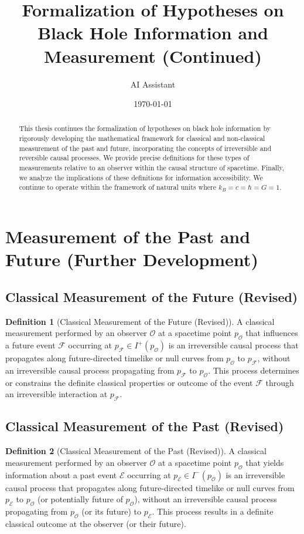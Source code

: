 \documentclass{article}
\title{Formalization of Hypotheses on Black Hole Information and Measurement (Continued)}
\author{AI Assistant}
\date{\today}
\theoremstyle{definition}
\newtheorem{definition}{Definition}[section]
\begin{document}
	
	\maketitle
	
	\begin{abstract}
		This thesis continues the formalization of hypotheses on black hole information by rigorously developing the mathematical framework for classical and non-classical measurement of the past and future, incorporating the concepts of irreversible and reversible causal processes. We provide precise definitions for these types of measurements relative to an observer within the causal structure of spacetime. Finally, we analyze the implications of these definitions for information accessibility. We continue to operate within the framework of natural units where $k_B = c = \hbar = G = 1$.
	\end{abstract}
	
	\section{Measurement of the Past and Future (Further Development)}
	
	\subsection{Classical Measurement of the Future (Revised)}
	
	\begin{definition}[Classical Measurement of the Future (Revised)]
		A classical measurement performed by an observer $\mathcal{O}$ at a spacetime point $p_{\mathcal{O}}$ that influences a future event $\mathcal{F}$ occurring at $p_{\mathcal{F}} \in I^+(p_{\mathcal{O}})$ is an irreversible causal process that propagates along future-directed timelike or null curves from $p_{\mathcal{O}}$ to $p_{\mathcal{F}}$, without an irreversible causal process propagating from $p_{\mathcal{F}}$ to $p_{\mathcal{O}}$. This process determines or constrains the definite classical properties or outcome of the event $\mathcal{F}$ through an irreversible interaction at $p_{\mathcal{F}}$.
	\end{definition}
	
	\subsection{Classical Measurement of the Past (Revised)}
	
	\begin{definition}[Classical Measurement of the Past (Revised)]
		A classical measurement performed by an observer $\mathcal{O}$ at a spacetime point $p_{\mathcal{O}}$ that yields information about a past event $\mathcal{E}$ occurring at $p_{\mathcal{E}} \in I^-(p_{\mathcal{O}})$ is an irreversible causal process that propagates along future-directed timelike or null curves from $p_{\mathcal{E}}$ to $p_{\mathcal{O}}$ (or potentially future of $p_{\mathcal{O}}$), without an irreversible causal process propagating from $p_{\mathcal{O}}$ (or its future) to $p_{\mathcal{E}}$. This process results in a definite classical outcome at the observer (or their future).
	\end{definition}
	
\end{document}
